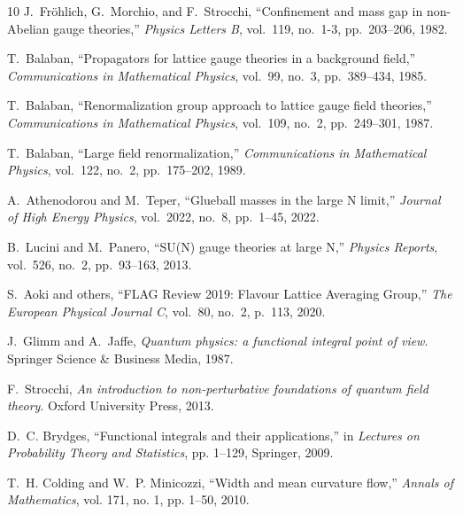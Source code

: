\documentclass[11pt]{article}
\numberwithin{equation}{section}
\theoremstyle{definition}
\theoremstyle{remark}
\begin{document}
\begin{thebibliography}{10}
J.~Fröhlich, G.~Morchio, and F.~Strocchi,
\newblock ``Confinement and mass gap in non-{Abelian} gauge theories,''
\newblock \emph{Physics Letters B}, vol.~119, no.~1-3, pp.~203--206, 1982.

T.~Balaban,
\newblock ``Propagators for lattice gauge theories in a background field,''
\newblock \emph{Communications in Mathematical Physics}, vol.~99, no.~3, pp.~389--434, 1985.

T.~Balaban,
\newblock ``Renormalization group approach to lattice gauge field theories,''
\newblock \emph{Communications in Mathematical Physics}, vol.~109, no.~2, pp.~249--301, 1987.

T.~Balaban,
\newblock ``Large field renormalization,''
\newblock \emph{Communications in Mathematical Physics}, vol.~122, no.~2, pp.~175--202, 1989.

A.~Athenodorou and M.~Teper,
\newblock ``Glueball masses in the large {N} limit,''
\newblock \emph{Journal of High Energy Physics}, vol.~2022, no.~8, pp.~1--45, 2022.

B.~Lucini and M.~Panero,
\newblock ``{SU(N)} gauge theories at large {N},''
\newblock \emph{Physics Reports}, vol.~526, no.~2, pp.~93--163, 2013.

S.~Aoki and others,
\newblock ``{FLAG} Review 2019: {Flavour} Lattice Averaging Group,''
\newblock \emph{The European Physical Journal C}, vol.~80, no.~2, p.~113, 2020.

J.~Glimm and A.~Jaffe,
\newblock \emph{Quantum physics: a functional integral point of view}.
\newblock Springer Science \& Business Media, 1987.

F.~Strocchi,
\newblock \emph{An introduction to non-perturbative foundations of quantum field theory}.
\newblock Oxford University Press, 2013.

D.~C. Brydges,
\newblock ``Functional integrals and their applications,''
\newblock in \emph{Lectures on Probability Theory and Statistics}, pp. 1--129, Springer, 2009.

T.~H. Colding and W.~P. Minicozzi,
\newblock ``Width and mean curvature flow,''
\newblock \emph{Annals of Mathematics}, vol. 171, no. 1, pp. 1--50, 2010.

\end{thebibliography}
\end{document}
